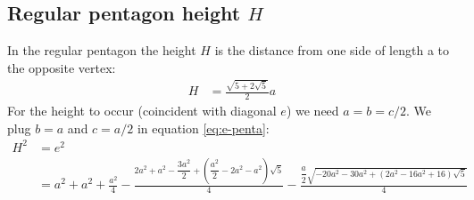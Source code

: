 \documentclass[11pt]{article}
\begin{document}
\subsection{Regular pentagon height $H$}

In the regular pentagon the height $H$ is the distance from one side of length a to the opposite vertex:
\begin{align}
H &= \frac{\sqrt{5+2\sqrt{5}}}{2}a
\end{align}
For the height to occur (coincident with diagonal $e$) we need $a = b = c/2$.
We plug $b=a$ and $c=a/2$ in equation \ref{eq:e-penta}:
\begin{align}
H^2 &= e^2\nonumber\\
 &= a^2 + a^2 + \frac{a^2}4
 - \frac{2a^2 + a^2 - \dfrac{3a^2}2 + \left(\dfrac{a^2}2 -2a^2 - a^2\right)\sqrt5}4
 - \frac{\dfrac{a}{2}\sqrt{- 20a^2 - 30a^2 + (2a^2 - 16a^2 + 16)\sqrt5}}4 \label{eq:e-penta}
\end{align}
\end{document}
